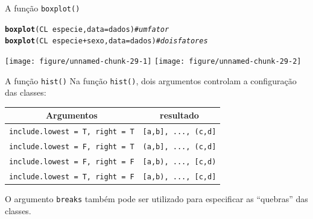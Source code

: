 \documentclass[10pt]{beamer}\usepackage[]{graphicx}\usepackage[]{color}
\makeatletter
\newcommand{\hlcom}[1]{\textcolor[rgb]{0.678,0.584,0.686}{\textit{#1}}}%
\newcommand{\hlopt}[1]{\textcolor[rgb]{0,0,0}{#1}}%
\newcommand{\hlstd}[1]{\textcolor[rgb]{0.345,0.345,0.345}{#1}}%
\newcommand{\hlkwc}[1]{\textcolor[rgb]{0.333,0.667,0.333}{#1}}%
\newcommand{\hlkwd}[1]{\textcolor[rgb]{0.737,0.353,0.396}{\textbf{#1}}}%
\newenvironment{kframe}{%
 \def\at@end@of@kframe{}%
 \ifinner\ifhmode%
  \def\at@end@of@kframe{\end{minipage}}%
  \begin{minipage}{\columnwidth}%
 \fi\fi%
 \def\FrameCommand##1{\hskip\@totalleftmargin \hskip-\fboxsep
 \colorbox{shadecolor}{##1}\hskip-\fboxsep
     \hskip-\linewidth \hskip-\@totalleftmargin \hskip\columnwidth}%
 \MakeFramed {\advance\hsize-\width
   \@totalleftmargin\z@ \linewidth\hsize
   \@setminipage}}%
 {\par\unskip\endMakeFramed%
 \at@end@of@kframe}
\newenvironment{knitrout}{}{} %
\makeatother
\begin{document}
\begin{frame}[fragile]{A função \texttt{boxplot()}}
\begin{knitrout}\small
{}\color{fgcolor}\begin{kframe}
\begin{alltt}
\hlkwd{boxplot}\hlstd{(CL} \hlopt{~} \hlstd{especie,} \hlkwc{data} \hlstd{= dados)}        \hlcom{# um fator}
\hlkwd{boxplot}\hlstd{(CL} \hlopt{~} \hlstd{especie} \hlopt{+} \hlstd{sexo,} \hlkwc{data} \hlstd{= dados)} \hlcom{# dois fatores}
\end{alltt}
\end{kframe}

{\centering \texttt{[image: figure/unnamed-chunk-29-1]} 
\texttt{[image: figure/unnamed-chunk-29-2]} 

}



\end{knitrout}
\end{frame}

\begin{frame}[fragile]{A função \texttt{hist()}}
Na função \texttt{hist()}, dois argumentos controlam a configuração das
classes:
\begin{center}
\begin{table}[h!]
\begin{tabular}{c|c}
\hline
Argumentos & resultado \\
\hline
\texttt{include.lowest = T, right = T} & \texttt{[a,b], ..., (c,d]} \\
\texttt{include.lowest = F, right = T} & \texttt{(a,b], ..., (c,d]} \\
\texttt{include.lowest = F, right = F} & \texttt{[a,b), ..., [c,d)} \\
\texttt{include.lowest = T, right = F} & \texttt{[a,b), ..., [c,d]} \\
\hline
\end{tabular}
\end{table}
\end{center}
O argumento \texttt{breaks} também pode ser utilizado para especificar
as ``quebras'' das classes.
\end{frame}

\end{document}
